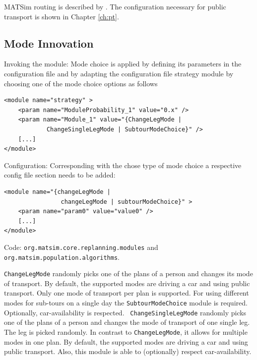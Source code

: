 MATSim routing is described by \citet[]{LefebvreBalmer_STRC_2007, LefebvreBalmer_TechRep_IVT_2007}. The configuration necessary for public transport is shown in Chapter \ref{ch:pt}.  

\subsection{Mode Innovation}
\label{sec:modechoice}
\begin{compactitem}
\item Invoking the module: Mode choice is applied by defining its parameters in the configuration file and by adapting the configuration file strategy module by choosing one of the mode choice options as follows
\begin{lstlisting}
<module name="strategy" >
    <param name="ModuleProbability_1" value="0.x" />
    <param name="Module_1" value="{ChangeLegMode |
    		ChangeSingleLegMode | SubtourModeChoice}" />
    [...]
</module>
\end{lstlisting}
%
\item Configuration: Corresponding with the chose type of mode choice a respective config file section needs to be added:
%
\begin{lstlisting}
<module name="{changeLegMode |
				changeLegMode | subtourModeChoice}" >
    <param name="param0" value="value0" />
    [...]
</module>
\end{lstlisting}
%
\item Code: \lstinline|org.matsim.core.replanning.modules| and \lstinline|org.matsim.population.algorithms|.
\end{compactitem}

\lstinline|ChangeLegMode| randomly picks one of the plans of a person and changes its mode of transport. By default, the supported modes are driving a car and using public transport. Only one mode of transport per plan is supported. For using different modes for sub-tours on a single day the \lstinline|SubtourModeChoice| module is required. Optionally, car-availability is respected. \lstinline| ChangeSingleLegMode| randomly picks one of the plans of a person and changes the mode of transport of one single leg. The leg is picked randomly. In contrast to \lstinline|ChangeLegMode|, it allows for multiple modes in one plan. By default, the supported modes are driving a car and using public transport. Also, this module is able to (optionally) respect car-availability.


